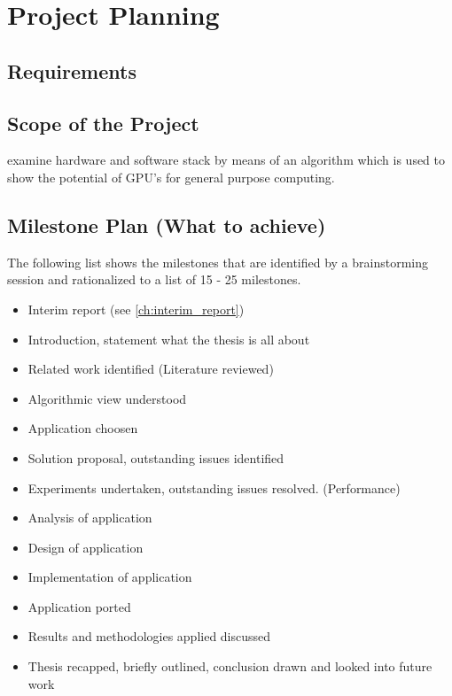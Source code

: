 \chapter{Project Planning} %
\label{ch:project_planning}
\section*{Requirements} %
\label{sub:requirements}


\section*{Scope of the Project} %
\label{sec:scope_of_the_project}
examine hardware and software stack by means of an algorithm which is used
to show the potential of GPU's for general purpose computing.

\section*{Milestone Plan (What to achieve)} %
\label{sec:milestone_plan_what_to_achieve_}
The following list shows the milestones that are identified by a 
brainstorming session and rationalized to a list of 15 - 25 milestones.

\begin{itemize}
	\item Interim report (see \autoref{ch:interim_report})
	\item Introduction, statement what the thesis is all about
	\item Related work identified (Literature reviewed)
	\item Algorithmic view understood
	\item Application choosen
	\item Solution proposal, outstanding issues identified
	\item Experiments undertaken, outstanding issues resolved. (Performance)
	\item Analysis of application
	\item Design of application
	\item Implementation of application
	\item Application ported
	\item Results and methodologies applied discussed
	\item Thesis recapped, briefly outlined, conclusion drawn and looked into future work
\end{itemize}

